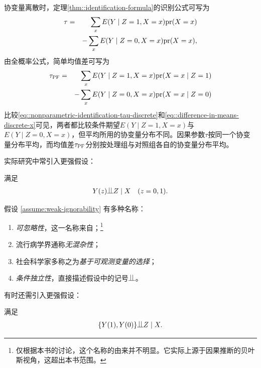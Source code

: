  
 协变量离散时，定理\ref{thm::identification-formula}的识别公式可写为
\begin{eqnarray}
 \tau  &=&  \sum_x  E(Y\mid Z=1, X=x)  \textup{pr}(X=x)  \nonumber \\
 &&  - \sum_x E(Y\mid Z=0, X=x) \textup{pr}(X=x), \label{eq::nonparametric-identification-tau-discrete}
\end{eqnarray}
由全概率公式，简单均值差可写为
\begin{eqnarray}  
 \tau_\textsc{PF} &=& \sum_x   E(Y\mid Z=1, X=x) \textup{pr}(X=x\mid Z=1) \nonumber  \\
 &&- \sum_x   E(Y\mid Z=0, X=x) \textup{pr}(X=x\mid Z=0)  \label{eq::difference-in-means-discrete-x}
  \end{eqnarray}
比较\eqref{eq::nonparametric-identification-tau-discrete}和\eqref{eq::difference-in-means-discrete-x}可见，两者都比较条件期望$ E(Y\mid Z=1, X=x) $与$ E(Y\mid Z=0, X=x)$，但平均所用的协变量分布不同。因果参数$\tau$按同一个协变量分布平均，而均值差$ \tau_\textsc{PF} $分别按处理组与对照组各自的协变量分布平均。 
 
 
 
 实际研究中常引入更强假设：
 
 \begin{assumption}[可忽略性]
 \label{assume:weak-ignorability} 
 满足
\begin{eqnarray}
 Y(z) \ind Z \mid X \quad (z=0,1) .
 \label{eq::ignorability}
\end{eqnarray}
 \end{assumption}
 
 
假设 \ref{assume:weak-ignorability} 有多种名称：
\begin{enumerate}
\item
{\it 可忽略性}，这一名称来自\citet{rubin1978bayesian}；\footnote{仅根据本书的讨论，这个名称的由来并不明显。它实际上源于因果推断的贝叶斯视角，这超出本书范围。}

\item
流行病学界通称{\it 无混杂性}；

\item
社会科学家多称之为{\it 基于可观测变量的选择}；

\item
{\it 条件独立性}，直接描述假设中的记号$\ind$。
\end{enumerate}


有时还需引入更强假设：

\begin{assumption}[强可忽略性]
\label{assume:strong-ignorability}
满足
\begin{eqnarray}
 \{  Y(1), Y(0)  \} \ind Z \mid X .
  \label{eq::strong-ignorability}
\end{eqnarray}
\end{assumption}


